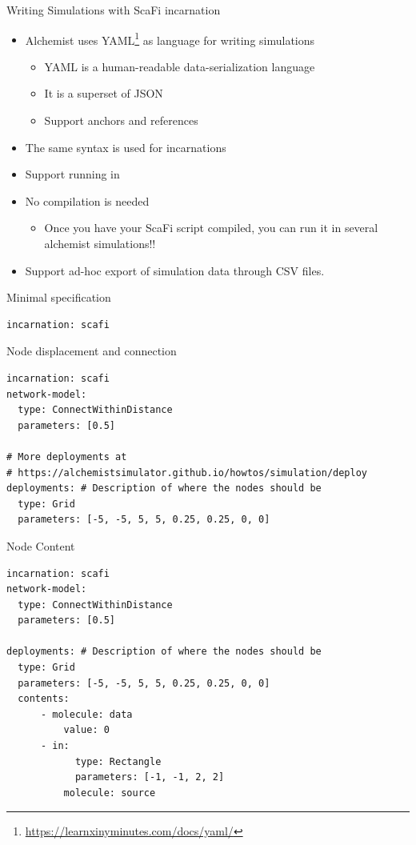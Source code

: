 \documentclass[presentation, 9pt]{beamer}\mode<presentation>{\usetheme{AMSBolognaFC}}
\begin{document}
\begin{frame}{Writing Simulations with ScaFi incarnation}
\begin{itemize}
	\item Alchemist uses YAML\footnote{\url{https://learnxinyminutes.com/docs/yaml/}} as language for writing simulations
	\begin{itemize}
		\item YAML is a human-readable data-serialization language
		\item It is a superset of JSON
		\item Support anchors and references
	\end{itemize}
	\item The same syntax is used for  incarnations
	\item Support running in 
	\item No compilation is needed 
	\begin{itemize}
		\item[\faThumbsUp] Once you have your ScaFi script compiled, you can run it in several alchemist simulations!!
	\end{itemize}
	\item Support ad-hoc export of simulation data through CSV files. 
\end{itemize}
\end{frame}
\begin{frame}[fragile]{Minimal specification}
\begin{verbatim}
incarnation: scafi
\end{verbatim}
\end{frame}
\begin{frame}[fragile]{Node displacement and connection}
\begin{verbatim}
incarnation: scafi
network-model:
  type: ConnectWithinDistance
  parameters: [0.5]

# More deployments at 
# https://alchemistsimulator.github.io/howtos/simulation/deploy
deployments: # Description of where the nodes should be
  type: Grid
  parameters: [-5, -5, 5, 5, 0.25, 0.25, 0, 0]
\end{verbatim}
\end{frame}
\begin{frame}[fragile]{Node Content}
	\begin{verbatim}
incarnation: scafi
network-model:
  type: ConnectWithinDistance
  parameters: [0.5]

deployments: # Description of where the nodes should be
  type: Grid
  parameters: [-5, -5, 5, 5, 0.25, 0.25, 0, 0]
  contents:
	  - molecule: data
		  value: 0
	  - in:
		  	type: Rectangle
		  	parameters: [-1, -1, 2, 2]
		  molecule: source
\end{verbatim}
\end{frame}
\end{document}
